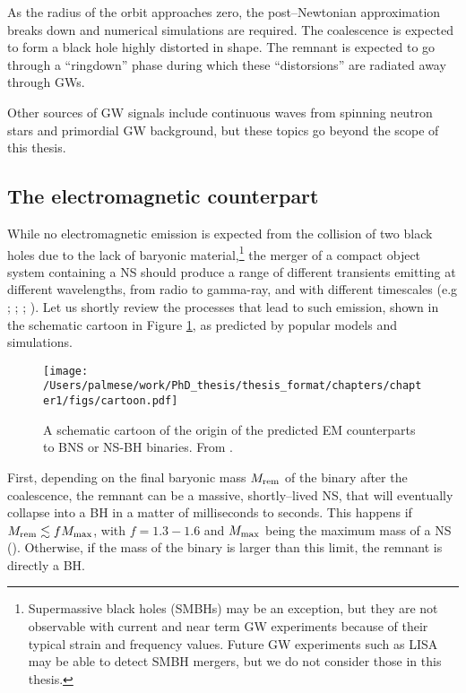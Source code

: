 As the radius of the orbit approaches zero, the post--Newtonian approximation breaks down and numerical simulations are required. The coalescence is expected to form a black hole highly distorted in shape. The remnant is expected to go through a ``ringdown'' phase during which these ``distorsions'' are radiated away through GWs.

Other sources of GW signals include continuous waves from spinning neutron stars and primordial GW background, but these topics go beyond the scope of this thesis.

\subsection{The electromagnetic counterpart}

While no electromagnetic emission is expected from the collision of two black holes due to the lack of baryonic material,\footnote{Supermassive black holes (SMBHs) may be an exception, but they are not observable with current and near term GW experiments because of their typical strain and frequency values. Future GW experiments such as LISA may be able to detect SMBH mergers, but we do not consider those in this thesis.} the merger of a compact object system containing a NS should produce a range of different transients emitting at different wavelengths, from radio to gamma-ray, and with different timescales (e.g \citealt{bloom09}; \citealt{EMreview}; \citealt{piran}; \citealt{rosswog}). Let us shortly review the processes that lead to such emission, shown in the schematic cartoon in  Figure \ref{fig:cartoon}, as predicted by popular models and simulations.

\begin{figure}\centering
\texttt{[image: /Users/palmese/work/PhD\_thesis/thesis\_format/chapters/chapter1/figs/cartoon.pdf]}
\caption{A schematic cartoon of the origin of the predicted EM counterparts to BNS or NS-BH binaries. From \citet{Metzger}.}\label{fig:cartoon}
\end{figure}

First, depending on the final baryonic mass $M_{\rm rem}$ of the binary after the coalescence, the remnant can be a massive, shortly--lived NS, that will eventually collapse into a BH in a matter of milliseconds to seconds. This happens if $M_{\rm rem}\lesssim f M_{\rm max}$, with $f=1.3-1.6$ and $M_{\rm max}$ being the maximum mass of a NS (\citealt{Bauswein}). Otherwise, if the mass of the binary is larger than this limit, the remnant is directly a BH. 

